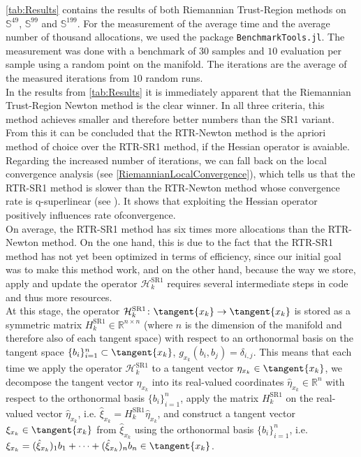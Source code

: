 \cref{tab:Results} contains the results of both Riemannian Trust-Region methods on $\mathbb{S}^{49}$, $\mathbb{S}^{99}$ and $\mathbb{S}^{199}$. For the measurement of the average time and the average number of thousand allocations, we used the package \lstinline!BenchmarkTools.jl!. The measurement was done with a benchmark of $30$ samples and $10$ evaluation per sample using a random point on the manifold. The iterations are the average of the measured iterations from $10$ random runs. \\
In the results from \cref{tab:Results} it is immediately apparent that the Riemannian Trust-Region Newton method is the clear winner. In all three criteria, this method achieves smaller and therefore better numbers than the SR1 variant. From this it can be concluded that the RTR-Newton method is the apriori method of choice over the RTR-SR1 method, if the Hessian operator is avaiable. \\
Regarding the increased number of iterations, we can fall back on the local convergence analysis (see \cref{RiemannianLocalConvergence}), which tells us that the RTR-SR1 method is slower than the RTR-Newton method whose convergence rate is q-superlinear (see \cite[Theorem~4.13]{AbsilBakerGallivan:2007}). It shows that exploiting the Hessian operator positively influences rate ofconvergence. \\ 
On average, the RTR-SR1 method has six times more allocations than the RTR-Newton method. On the one hand, this is due to the fact that the RTR-SR1 method has not yet been optimized in terms of efficiency, since our initial goal was to make this method work, and on the other hand, because the way we store, apply and update the operator $\mathcal{H}^{\mathrm{SR1}}_k$ requires several intermediate steps in code and thus more resources. \\
At this stage, the operator $\mathcal{H}^{\mathrm{SR1}}_k \colon \tangent{x_k} \to \tangent{x_k}$ is stored as a symmetric matrix $H^{\mathrm{SR1}}_k \in \mathbb{R}^{n \times n}$ (where $n$ is the dimension of the manifold and therefore also of each tangent space) with respect to an orthonormal basis on the tangent space $\{ b_i \}^{n}_{i=1} \subset \tangent{x_k}$, $g_{x_k}(b_i, b_j) = \delta_{i,j}$. This means that each time we apply the operator $\mathcal{H}^{\mathrm{SR1}}_k$ to a tangent vector $\eta_{x_k} \in \tangent{x_k}$, we decompose the tangent vector $\eta_{x_k}$ into its real-valued coordinates $\hat{\eta}_{x_k} \in \mathbb{R}^n$ with respect to the orthonormal basis $\{ b_i \}^{n}_{i=1}$, apply the matrix $H^{\mathrm{SR1}}_k$ on the real-valued vector $\hat{\eta}_{x_k}$, i.e. $\hat{\xi}_{x_k} = H^{\mathrm{SR1}}_k \hat{\eta}_{x_k}$, and construct a tangent vector $\xi_{x_k} \in \tangent{x_k}$ from $\hat{\xi}_{x_k}$ using the orthonormal basis $\{ b_i \}^{n}_{i=1}$, i.e. $\xi_{x_k} = (\hat{\xi}_{x_k})_{1} b_1 + \cdots + (\hat{\xi}_{x_k})_{n} b_n \in \tangent{x_k}$. \\
